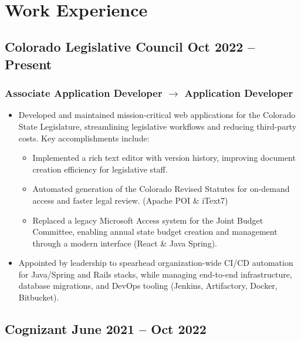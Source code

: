 \documentclass{article}
\begin{document}
	\begin{center}
		{\sffamily\LARGE\bfseries {}} \par\bigskip
		\sffamily\footnotesize {} \\ \medskip
		 \par
	\end{center}

\section{Work Experience}
	\subsection{Colorado Legislative Council \hfill Oct 2022 – Present}
	\subsubsection{Associate Application Developer $\rightarrow$ Application Developer}
	\begin{itemize}
		\item Developed and maintained mission-critical web applications for the Colorado State Legislature, streamlining legislative workflows and reducing third-party costs. Key accomplishments include:
		\begin{itemize}
			\item Implemented a rich text editor with version history, improving document creation efficiency for legislative staff.
			\item Automated generation of the Colorado Revised Statutes for on-demand access and faster legal review. (Apache POI \& iText7)
			\item Replaced a legacy Microsoft Access system for the Joint Budget Committee, enabling annual state budget creation and management through a modern interface (React \& Java Spring).
		\end{itemize}
		\item Appointed by leadership to spearhead organization-wide CI/CD automation for Java/Spring and Rails stacks, while managing end-to-end infrastructure, database migrations, and DevOps tooling (Jenkins, Artifactory, Docker, Bitbucket).
	\end{itemize}

	\subsection{Cognizant \hfill June 2021 – Oct 2022}
\end{document}
